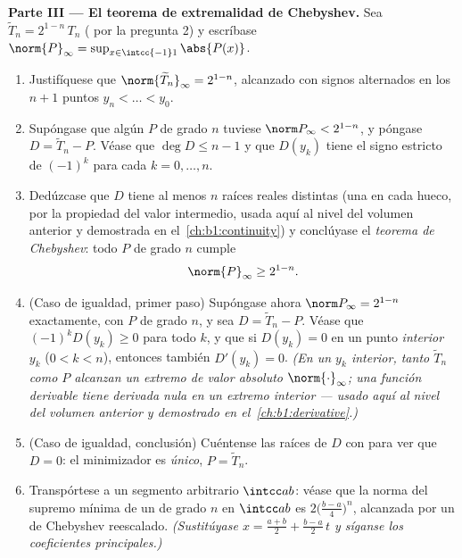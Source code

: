 \begin{problem}
\medskip
\noindent\textbf{Parte III --- El teorema de extremalidad de
Chebyshev.} Sea $\widetilde T_n = 2^{1-n}\,T_n$ ( por la
pregunta 2) y escríbase $\norm{P}_\infty = \sup_{x \in \intcc{-1}1}\abs{P(x)}$.
\begin{enumerate}[resume]
  \item Justifíquese que $\norm{\widetilde T_n}_\infty = 2^{1-n}$,
        alcanzado con signos alternados en los $n + 1$ puntos
        $y_n < \dots < y_0$.
  \item Supóngase que algún $P$  de grado $n$ tuviese
        $\norm P_\infty < 2^{1-n}$, y póngase $D = \widetilde T_n - P$.
        Véase que $\deg D \leq n - 1$ y que $D(y_k)$ tiene el signo
        estricto de $(-1)^k$ para cada $k = 0, \dots, n$.
  \item Dedúzcase que $D$ tiene al menos $n$ raíces reales distintas
        (una en cada hueco, por la propiedad del valor intermedio,
        usada aquí al nivel del volumen anterior y demostrada en
        el~\cref{ch:b1:continuity}) y conclúyase el \emph{teorema de
        Chebyshev}: todo $P$  de grado $n$ cumple
        \[
        \norm{P}_\infty \geq 2^{1-n} .
        \]
  \item (Caso de igualdad, primer paso) Supóngase ahora
        $\norm P_\infty = 2^{1-n}$ exactamente, con $P$  de
        grado $n$, y sea $D = \widetilde T_n - P$. Véase que
        $(-1)^kD(y_k) \geq 0$ para todo $k$, y que si $D(y_k) = 0$ en
        un punto \emph{interior} $y_k$ ($0 < k < n$), entonces también
        $D'(y_k) = 0$. \emph{(En un $y_k$ interior, tanto
        $\widetilde T_n$ como $P$ alcanzan un extremo de valor
        absoluto $\norm{\cdot}_\infty$; una función derivable tiene
        derivada nula en un extremo interior --- usado aquí al nivel
        del volumen anterior y demostrado en
        el~\cref{ch:b1:derivative}.)}
  \item (Caso de igualdad, conclusión) Cuéntense las raíces de $D$ con
         para ver que $D = 0$: el minimizador es
        \emph{único}, $P = \widetilde T_n$.
  \item Transpórtese a un segmento arbitrario $\intcc ab$: véase que
        la norma del supremo mínima de un  de grado
        $n$ en $\intcc ab$ es $2\bigl(\frac{b-a}4\bigr)^n$, alcanzada
        por un  de Chebyshev reescalado. \emph{(Sustitúyase
        $x = \frac{a+b}2 + \frac{b-a}2\,t$ y síganse los coeficientes
        principales.)}
\end{enumerate}


\end{problem}
